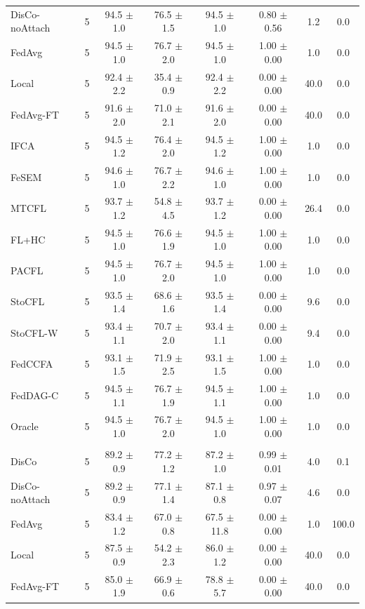 {{\begin{tabular}{l r c c c c c c}
DisCo-noAttach & 5 & 94.5 $\pm$ 1.0 & 76.5 $\pm$ 1.5 & 94.5 $\pm$ 1.0 & 0.80 $\pm$ 0.56 & 1.2 & 0.0 \\
FedAvg & 5 & 94.5 $\pm$ 1.0 & 76.7 $\pm$ 2.0 & 94.5 $\pm$ 1.0 & 1.00 $\pm$ 0.00 & 1.0 & 0.0 \\
Local & 5 & 92.4 $\pm$ 2.2 & 35.4 $\pm$ 0.9 & 92.4 $\pm$ 2.2 & 0.00 $\pm$ 0.00 & 40.0 & 0.0 \\
FedAvg-FT & 5 & 91.6 $\pm$ 2.0 & 71.0 $\pm$ 2.1 & 91.6 $\pm$ 2.0 & 0.00 $\pm$ 0.00 & 40.0 & 0.0 \\
IFCA & 5 & 94.5 $\pm$ 1.2 & 76.4 $\pm$ 2.0 & 94.5 $\pm$ 1.2 & 1.00 $\pm$ 0.00 & 1.0 & 0.0 \\
FeSEM & 5 & 94.6 $\pm$ 1.0 & 76.7 $\pm$ 2.2 & 94.6 $\pm$ 1.0 & 1.00 $\pm$ 0.00 & 1.0 & 0.0 \\
MTCFL & 5 & 93.7 $\pm$ 1.2 & 54.8 $\pm$ 4.5 & 93.7 $\pm$ 1.2 & 0.00 $\pm$ 0.00 & 26.4 & 0.0 \\
FL+HC & 5 & 94.5 $\pm$ 1.0 & 76.6 $\pm$ 1.9 & 94.5 $\pm$ 1.0 & 1.00 $\pm$ 0.00 & 1.0 & 0.0 \\
PACFL & 5 & 94.5 $\pm$ 1.0 & 76.7 $\pm$ 2.0 & 94.5 $\pm$ 1.0 & 1.00 $\pm$ 0.00 & 1.0 & 0.0 \\
StoCFL & 5 & 93.5 $\pm$ 1.4 & 68.6 $\pm$ 1.6 & 93.5 $\pm$ 1.4 & 0.00 $\pm$ 0.00 & 9.6 & 0.0 \\
StoCFL-W & 5 & 93.4 $\pm$ 1.1 & 70.7 $\pm$ 2.0 & 93.4 $\pm$ 1.1 & 0.00 $\pm$ 0.00 & 9.4 & 0.0 \\
FedCCFA & 5 & 93.1 $\pm$ 1.5 & 71.9 $\pm$ 2.5 & 93.1 $\pm$ 1.5 & 1.00 $\pm$ 0.00 & 1.0 & 0.0 \\
FedDAG-C & 5 & 94.5 $\pm$ 1.1 & 76.7 $\pm$ 1.9 & 94.5 $\pm$ 1.1 & 1.00 $\pm$ 0.00 & 1.0 & 0.0 \\
Oracle & 5 & 94.5 $\pm$ 1.0 & 76.7 $\pm$ 2.0 & 94.5 $\pm$ 1.0 & 1.00 $\pm$ 0.00 & 1.0 & 0.0 \\
\addlinespace
\multicolumn{8}{l}{\textit{Minority groups}} \\
DisCo & 5 & 89.2 $\pm$ 0.9 & 77.2 $\pm$ 1.2 & 87.2 $\pm$ 1.0 & 0.99 $\pm$ 0.01 & 4.0 & 0.1 \\
DisCo-noAttach & 5 & 89.2 $\pm$ 0.9 & 77.1 $\pm$ 1.4 & 87.1 $\pm$ 0.8 & 0.97 $\pm$ 0.07 & 4.6 & 0.0 \\
FedAvg & 5 & 83.4 $\pm$ 1.2 & 67.0 $\pm$ 0.8 & 67.5 $\pm$ 11.8 & 0.00 $\pm$ 0.00 & 1.0 & 100.0 \\
Local & 5 & 87.5 $\pm$ 0.9 & 54.2 $\pm$ 2.3 & 86.0 $\pm$ 1.2 & 0.00 $\pm$ 0.00 & 40.0 & 0.0 \\
FedAvg-FT & 5 & 85.0 $\pm$ 1.9 & 66.9 $\pm$ 0.6 & 78.8 $\pm$ 5.7 & 0.00 $\pm$ 0.00 & 40.0 & 0.0 \\

\end{tabular}}}
